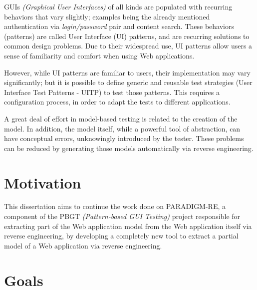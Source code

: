 \documentclass[9pt,a4paper]{extarticle}
\begin{document}
\begin{multicols}{2}
GUIs \textit{(Graphical User Interfaces)} of all kinds are populated with recurring behaviors that vary slightly; examples being the already mentioned authentication via \textit{login/password} pair and content search. These behaviors (patterns) are called User Interface (UI) patterns, and are recurring solutions to common design problems. Due to their widespread use, UI patterns allow users a sense of familiarity and comfort when using Web applications.

However, while UI patterns are familiar to users, their implementation may vary significantly; but it is possible to define generic and reusable test strategies (User Interface Test Patterns - UITP) to test those patterns. This requires a configuration process, in order to adapt the tests to different applications.

A great deal of effort in model-based testing is related to the creation of the model. In addition, the model itself, while a powerful tool of abstraction, can have conceptual errors, unknowingly introduced by the tester. These problems can be reduced by generating those models automatically via reverse engineering. 

\section{Motivation}\label{sec:motiva}

This dissertation aims to continue the work done on PARADIGM-RE, a component of the PBGT \textit{(Pattern-based GUI Testing)} project responsible for extracting part of the Web application model from the Web application itself via reverse engineering, by developing a completely new tool to extract a partial model of a Web application via reverse engineering. 

\section{Goals}\label{sec:goals}



\end{multicols}
\end{document}
